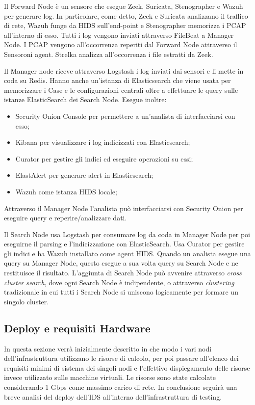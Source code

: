 \vspace{5mm}
Il Forward Node è un sensore che esegue Zeek, Suricata, Stenographer e Wazuh per generare log. In particolare, come detto, Zeek e Suricata analizzano il traffico di rete, Wazuh funge da HIDS sull'end-point e Stenographer memorizza i PCAP all'interno di esso. Tutti i log vengono inviati attraverso FileBeat a Manager Node. I PCAP vengono all'occorrenza reperiti dal Forward Node attraverso il Sensoroni agent.
Strelka analizza all'occorrenza i file estratti da Zeek.

\vspace{5mm}
Il Manager node riceve attraverso Logstash i log  inviati dai sensori e li mette in coda su Redis.
Hanno anche un'istanza di Elasticsearch che viene usata per memorizzare i Case e le configurazioni centrali oltre a effettuare le query sulle istanze ElasticSearch dei Search Node.
Esegue inoltre:
\begin{itemize}
    \item Security Onion Console per permettere a un'analista di interfacciarsi con esso;
    \item Kibana per visualizzare  i log indicizzati con Elasticsearch;
    \item Curator per gestire gli indici ed eseguire operazioni su essi;
    \item ElastAlert per generare alert  in Elasticsearch;
    \item Wazuh come istanza HIDS locale;
\end{itemize}
Attraverso il Manager Node l'analista può interfacciarsi con Security Onion per eseguire query e reperire/analizzare dati.

\vspace{5mm}
Il Search Node usa Logstash per consumare log da coda in Manager Node per poi eseguirne il parsing e l'indicizzazione con ElasticSearch. Usa Curator per gestire gli indici e ha Wazuh installato come agent HIDS. Quando un analista esegue una query su Manager Node, questo esegue a sua volta query su Search Node e ne restituisce il risultato.
L'aggiunta di Search Node può avvenire attraverso \textit{cross cluster search}, dove ogni Search Node è indipendente, o attraverso \textit{clustering} tradizionale in cui tutti i Search Node si uniscono logicamente per formare un singolo cluster.

\subsection{Deploy e requisiti Hardware}
In questa sezione verrà inizialmente descritto in che modo i vari nodi dell'infrastruttura utilizzano le risorse di calcolo, per poi passare all'elenco dei requisiti minimi di sistema \cite{securityOnionRequirements} dei singoli nodi e l'effettivo dispiegamento delle risorse invece utilizzato sulle macchine virtuali.
Le risorse sono state calcolate considerando 1 Gbps come massimo carico di rete.
In conclusione seguirà una breve analisi del  deploy dell'IDS all'interno dell'infrastruttura di testing.



